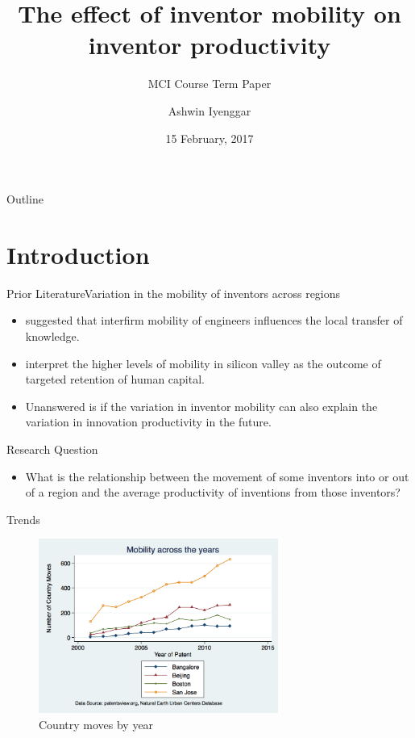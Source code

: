 \documentclass{beamer}
\title{The effect of inventor mobility on  inventor productivity}
\subtitle{MCI Course Term Paper}
\author{Ashwin Iyenggar}
\institute[Indian Institute of Management Bangalore] 
{
  Corporate Strategy and Policy\\
  Indian Institute of Management Bangalore
}
\date{15 February, 2017}
\begin{document}
\begin{frame}
  \titlepage
\end{frame}

\begin{frame}{Outline}
  \tableofcontents
\end{frame}

\section{Introduction}
\begin{frame}{Prior Literature}{Variation in the mobility of inventors across regions}
\begin{itemize}
\item{\cite{Almeida1999} suggested that interfirm mobility of engineers influences the local transfer of knowledge.}
\item{\cite{Ge2016} interpret the higher levels of mobility in silicon valley as the outcome of targeted retention of human capital.}
\item{Unanswered is if the variation in inventor mobility can also explain the variation in innovation productivity in the future.}
\end{itemize}
\end{frame}

\begin{frame}{Research Question}{}
\begin{itemize}
\item{What is the relationship between the movement of some inventors into or out of a region and the average productivity of inventions from those inventors?}
\end{itemize}
\end{frame}

\begin{frame}{Trends}{}
\begin{figure}[h]
\begin{centering}
  \includegraphics[width=0.7\textwidth]{countrymoves}
  \caption{Country moves by year}
   \label{fig:countrymoves}
\end{centering}
\end{figure}
\end{frame}
\end{document}

